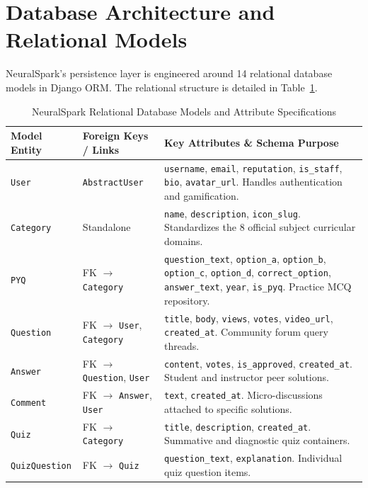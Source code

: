 \section{Database Architecture and Relational Models}
NeuralSpark's persistence layer is engineered around 14 relational database models in Django ORM. The relational structure is detailed in Table~\ref{tab:detailed_models}.

\begin{table}[H]
\centering
\caption{NeuralSpark Relational Database Models and Attribute Specifications}
\label{tab:detailed_models}
\small
\begin{tabularx}{\textwidth}{p{3.2cm} p{4.0cm} X}
\toprule
\textbf{Model Entity} & \textbf{Foreign Keys / Links} & \textbf{Key Attributes \& Schema Purpose} \\
\midrule
\texttt{User} & \texttt{AbstractUser} & \texttt{username}, \texttt{email}, \texttt{reputation}, \texttt{is\_staff}, \texttt{bio}, \texttt{avatar\_url}. Handles authentication and gamification. \\
\texttt{Category} & Standalone & \texttt{name}, \texttt{description}, \texttt{icon\_slug}. Standardizes the 8 official subject curricular domains. \\
\texttt{PYQ} & FK $\rightarrow$ \texttt{Category} & \texttt{question\_text}, \texttt{option\_a}, \texttt{option\_b}, \texttt{option\_c}, \texttt{option\_d}, \texttt{correct\_option}, \texttt{answer\_text}, \texttt{year}, \texttt{is\_pyq}. Practice MCQ repository. \\
\texttt{Question} & FK $\rightarrow$ \texttt{User}, \texttt{Category} & \texttt{title}, \texttt{body}, \texttt{views}, \texttt{votes}, \texttt{video\_url}, \texttt{created\_at}. Community forum query threads. \\
\texttt{Answer} & FK $\rightarrow$ \texttt{Question}, \texttt{User} & \texttt{content}, \texttt{votes}, \texttt{is\_approved}, \texttt{created\_at}. Student and instructor peer solutions. \\
\texttt{Comment} & FK $\rightarrow$ \texttt{Answer}, \texttt{User} & \texttt{text}, \texttt{created\_at}. Micro-discussions attached to specific solutions. \\
\texttt{Quiz} & FK $\rightarrow$ \texttt{Category} & \texttt{title}, \texttt{description}, \texttt{created\_at}. Summative and diagnostic quiz containers. \\
\texttt{QuizQuestion} & FK $\rightarrow$ \texttt{Quiz} & \texttt{question\_text}, \texttt{explanation}. Individual quiz question items. \\

\end{tabularx}
\end{table}

